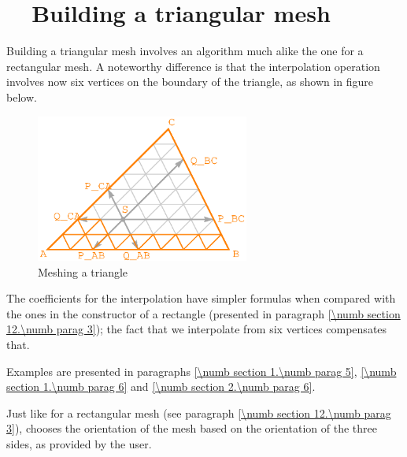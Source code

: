 \section{~~Building a triangular mesh}\label{\numb section 12.\numb parag 4}

Building a triangular mesh involves an algorithm much alike the one for a rectangular mesh.
A noteworthy difference is that the interpolation operation involves now six vertices on
the boundary of the triangle, as shown in figure below.

\begin{figure}[ht] \centering
  \includegraphics[width=70mm]{fig-triangle}
  \caption{Meshing a triangle}
  \label{\numb section 12.\numb fig 2}
\end{figure}

The coefficients for the interpolation have simpler formulas when compared with the ones in the
constructor of a rectangle (presented in paragraph \ref{\numb section 12.\numb parag 3});
the fact that we interpolate from six vertices compensates that.

Examples are presented in paragraphs \ref{\numb section 1.\numb parag 5},
\ref{\numb section 1.\numb parag 6} and \ref{\numb section 2.\numb parag 6}.

Just like for a rectangular mesh (see paragraph \ref{\numb section 12.\numb parag 3}),
{\maniFEM} chooses the orientation of the mesh based on the orientation of the three sides,
as provided by the user.


